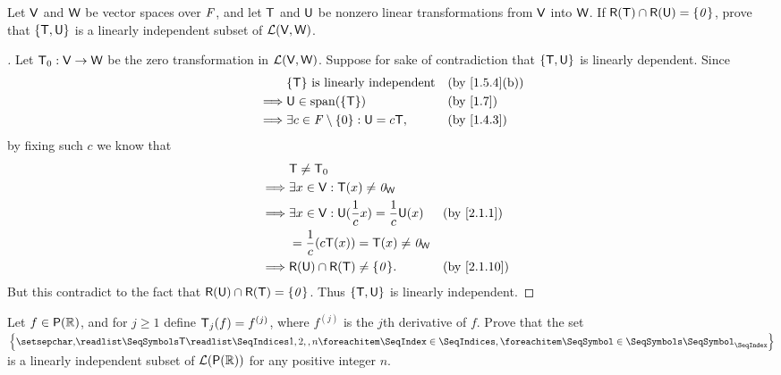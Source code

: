 \begin{ex}\label{ex:2.2.13}
  Let \(\mathsf{V}\) and \(\mathsf{W}\) be vector spaces over \(\mathit{F}\), and let \(\mathsf{T}\) and \(\mathsf{U}\) be nonzero linear transformations from \(\mathsf{V}\) into \(\mathsf{W}\).
  If \(\rg{\T} \cap \rg{\U} = \set{\zv}\), prove that \(\left\lbrace\mathsf{T}, \mathsf{U}\right\rbrace\) is a linearly independent subset of \(\mathcal{L}(\mathsf{V}, \mathsf{W})\).
\end{ex}

\begin{proof}[]
  Let \(\mathsf{T}_0 : \mathsf{V} \to \mathsf{W}\) be the zero transformation in \(\mathcal{L}(\mathsf{V}, \mathsf{W})\).
  Suppose for sake of contradiction that \(\left\lbrace\mathsf{T}, \mathsf{U}\right\rbrace\) is linearly dependent.
  Since
  \begin{align*}
             & \set{\T} \text{ is linearly independent}        &  & \text{(by \cref{1.5.4}(b))} \\
    \implies & \U \in \spn{\set{\T}}                           &  & \text{(by \cref{1.7})}      \\
    \implies & \exists c \in \F \setminus \set{0} : \U = c \T, &  & \text{(by \cref{1.4.3})}
  \end{align*}
  by fixing such \(c\) we know that
  \begin{align*}
             & \T \neq \zT                                                                             \\
    \implies & \exists x \in \V : \T(x) \neq \zv_{\W}                                                  \\
    \implies & \exists x \in \V : \U(\frac{1}{c} x) = \frac{1}{c} \U(x) &  & \text{(by \cref{2.1.1})}  \\
             & = \frac{1}{c} (c \T(x)) = \T(x) \neq \zv_{\W}                                           \\
    \implies & \rg{\U} \cap \rg{\T} \neq \set{\zv}.                     &  & \text{(by \cref{2.1.10})}
  \end{align*}
  But this contradict to the fact that \(\rg{\U} \cap \rg{\T} = \set{\zv}\).
  Thus \(\left\lbrace\mathsf{T}, \mathsf{U}\right\rbrace\) is linearly independent.
\end{proof}

\begin{ex}\label{ex:2.2.14}
  Let \(f \in \ps{\R}\), and for \(j \geq 1\) define \(\mathsf{T}_j(f) = f^{(j)}\), where \(f^{(j)}\) is the \(j\)th derivative of \(f\).
  Prove that the set \(\set{\seq{\T}{1,2,,n}}\) is a linearly independent subset of \(\ls(\ps{\R})\) for any positive integer \(n\).
\end{ex}

